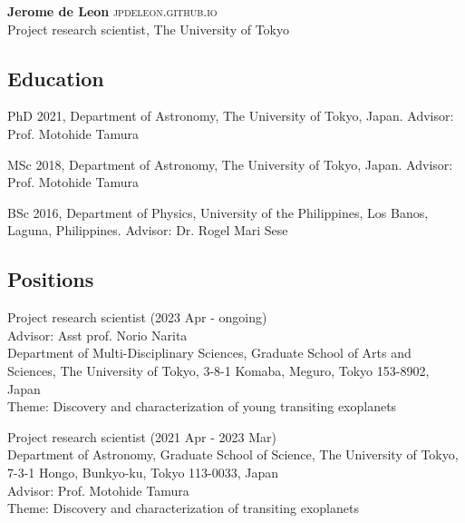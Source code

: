 \documentclass[12pt,letterpaper]{article}
\begin{document}
\thispagestyle{empty}\sloppy\sloppypar\raggedbottom

\textbf{\Large Jerome de Leon} \hfill
\textsc{\small jpdeleon.github.io} \\[0.5ex]
Project research scientist, The University of Tokyo\\[0.5ex]

\subsection{Education}
\begin{list}{}{\cvlist}
  \item
        PhD 2021, Department of Astronomy, The University of Tokyo, Japan. Advisor: Prof. Motohide Tamura
  \item
        MSc 2018, Department of Astronomy, The University of Tokyo, Japan. Advisor: Prof. Motohide Tamura
  \item
        BSc 2016, Department of Physics, University of the Philippines, Los Banos, Laguna, Philippines. Advisor: Dr. Rogel Mari Sese      
\end{list}

\subsection{Positions}
\begin{list}{}{\cvlist}
  \item
      Project research scientist (2023 Apr - ongoing) \\
      Advisor: Asst prof. Norio Narita \\
      Department of Multi-Disciplinary Sciences, Graduate School of Arts and Sciences, The University of Tokyo, 3-8-1 Komaba, Meguro, Tokyo 153-8902, Japan \\
      Theme: Discovery and characterization of young transiting exoplanets \\
  
  \item
      Project research scientist (2021 Apr - 2023 Mar) \\
      Department of Astronomy, Graduate School of Science, The University of Tokyo, 7-3-1 Hongo, Bunkyo-ku, Tokyo 113-0033, Japan \\
      Advisor: Prof. Motohide Tamura \\
      Theme: Discovery and characterization of transiting exoplanets \\
\end{list}
\end{document}
